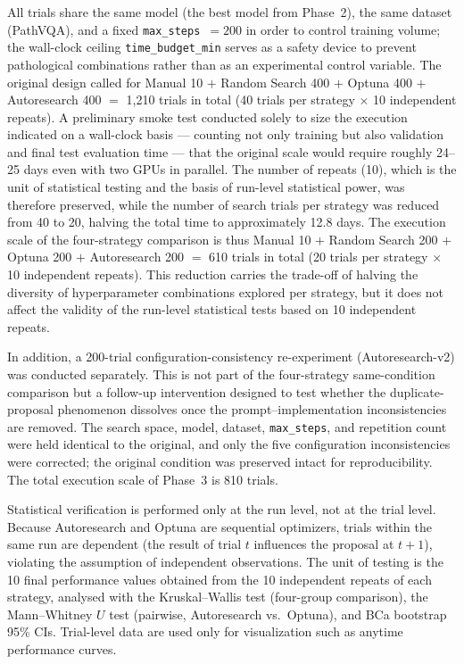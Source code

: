 All trials share the same model (the best model from Phase~2), the same dataset
(PathVQA), and a fixed \texttt{max\_steps}~$=200$ in order to control training
volume; the wall-clock ceiling \texttt{time\_budget\_min} serves as a safety
device to prevent pathological combinations rather than as an experimental
control variable. The original design called for Manual 10 $+$ Random Search 400
$+$ Optuna 400 $+$ Autoresearch 400 $=$ 1,210 trials in total (40 trials per
strategy $\times$ 10 independent repeats). A preliminary smoke test conducted
solely to size the execution indicated on a wall-clock basis --- counting not
only training but also validation and final test evaluation time --- that the
original scale would require roughly 24--25 days even with two GPUs in parallel.
The number of repeats (10), which is the unit of statistical testing and the
basis of run-level statistical power, was therefore preserved, while the number
of search trials per strategy was reduced from 40 to 20, halving the total time
to approximately 12.8 days. The execution scale of the four-strategy comparison
is thus Manual 10 $+$ Random Search 200 $+$ Optuna 200 $+$ Autoresearch 200 $=$
610 trials in total (20 trials per strategy $\times$ 10 independent repeats).
This reduction carries the trade-off of halving the diversity of hyperparameter
combinations explored per strategy, but it does not affect the validity of the
run-level statistical tests based on 10 independent repeats.

In addition, a 200-trial configuration-consistency re-experiment
(Autoresearch-v2) was conducted separately. This is not part of the four-strategy
same-condition comparison but a follow-up intervention designed to test whether
the duplicate-proposal phenomenon dissolves once the prompt--implementation
inconsistencies are removed. The search space, model, dataset,
\texttt{max\_steps}, and repetition count were held identical to the original,
and only the five configuration inconsistencies were corrected; the original
condition was preserved intact for reproducibility. The total execution scale of
Phase~3 is 810 trials.

Statistical verification is performed only at the run level, not at the trial
level. Because Autoresearch and Optuna are sequential optimizers, trials within
the same run are dependent (the result of trial $t$ influences the proposal at
$t+1$), violating the assumption of independent observations. The unit of testing
is the 10 final performance values obtained from the 10 independent repeats of
each strategy, analysed with the Kruskal--Wallis test (four-group comparison),
the Mann--Whitney $U$ test (pairwise, Autoresearch vs.\ Optuna), and BCa
bootstrap 95\% CIs. Trial-level data are used only for visualization such as
anytime performance curves.

